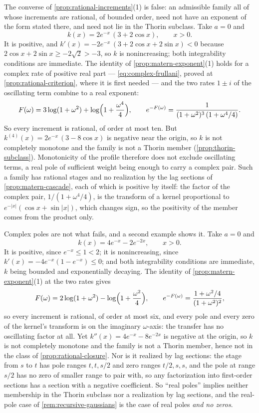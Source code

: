 \begin{remark}
\label{rem:rational-converse}
The converse of \ref{prop:rational-increments}(1) is false: an admissible family all of whose
increments are rational, of bounded order, need not have an exponent of the form stated there,
and need not lie in the Thorin subclass. Take $a = 0$ and
\[
  k(x) = 2e^{-x}\,(3 + 2\cos x), \qquad x > 0 .
\]
It is positive, and $k'(x) = -2e^{-x}\,(3 + 2\cos x + 2\sin x) < 0$ because
$2\cos x + 2\sin x \ge -2\sqrt2 > -3$, so $k$ is nonincreasing; both integrability conditions
are immediate. The identity of \ref{prop:matern-exponent}(1) holds for a complex rate of positive
real part --- \ref{eq:complex-frullani}, proved at \ref{prop:rational-criterion}, where it is
first needed --- and the two rates
$1 \pm i$ of the oscillating term combine to a real exponent:
\[
  F(\omega) = 3\log(1 + \omega^2) + \log\Bigl(1 + \frac{\omega^4}{4}\Bigr),
  \qquad
  e^{-F(\omega)} = \frac{1}{(1+\omega^2)^3\,(1 + \omega^4/4)} .
\]
So every increment is rational, of order at most ten. But
$k^{(4)}(x) = 2e^{-x}\,(3 - 8\cos x)$ is negative near the origin, so $k$ is not completely
monotone and the family is not a Thorin member (\ref{prop:thorin-subclass}). Monotonicity of the
profile therefore does not exclude oscillating terms, a real pole of sufficient weight being
enough to carry a complex pair. Such a family has rational stages and no realization by the
lag sections of \ref{prop:matern-cascade}, each of which is positive by itself: the factor
of the complex pair, $1/(1 + \omega^4/4)$, is the transform of a kernel proportional to
$e^{-|x|}(\cos x + \sin|x|)$, which changes sign, so the positivity of the member comes from
the product only.

Complex poles are not what fails, and a second example shows it. Take $a = 0$ and
\[
  k(x) = 4e^{-x} - 2e^{-2x}, \qquad x > 0 .
\]
It is positive, since $e^{-x} \le 1 < 2$; it is nonincreasing, since
$k'(x) = -4e^{-x}(1 - e^{-x}) \le 0$; and both integrability conditions are immediate, $k$ being
bounded and exponentially decaying. The identity of \ref{prop:matern-exponent}(1) at the two rates
gives
\[
  F(\omega) = 2\log(1 + \omega^2) - \log\Bigl(1 + \frac{\omega^2}{4}\Bigr),
  \qquad
  e^{-F(\omega)} = \frac{1 + \omega^2/4}{(1+\omega^2)^2},
\]
so every increment is rational, of order at most six, and every pole and every zero of the
kernel's transform is on the imaginary $\omega$-axis: the transfer has no oscillating factor at
all. Yet $k''(x) = 4e^{-x} - 8e^{-2x}$ is negative at the origin, so $k$ is not completely monotone
and the family is not a Thorin member, hence not in the class of \ref{prop:rational-closure}.
Nor is it realized by lag sections: the stage from $s$ to $t$ has pole ranges $t, t, s/2$ and zero
ranges $t/2, s, s$, and the pole at range $s/2$ has no zero of smaller range to pair with, so any
factorization into first-order sections has a section with a negative coefficient. So ``real
poles'' implies neither membership in the Thorin subclass nor a realization by lag sections, and
the real-pole case of \ref{rem:recursive-gaussians} is the case of real poles \emph{and no zeros}.
\end{remark}

